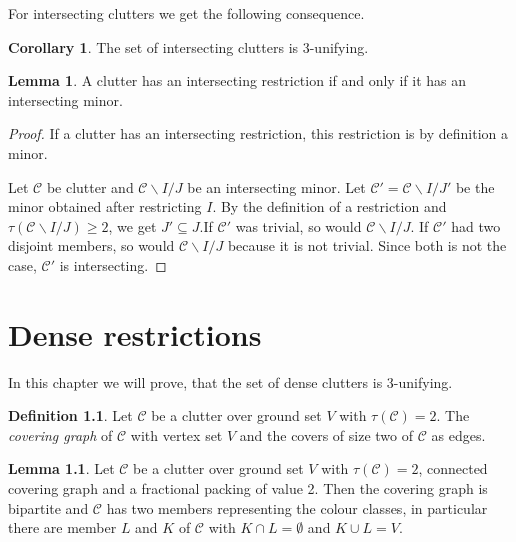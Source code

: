 \documentclass[a4paper, 12pt, twoside=false]{scrbook}
\theoremstyle{definition}
\newtheorem*{definition}{Definition}
\newtheorem{corollary}{Corollary}
\newtheorem{lemma}{Lemma}[chapter]
\begin{document}
   For intersecting clutters we get the following consequence.
   \begin{corollary}
       The set of intersecting clutters is 3-unifying.
   \end{corollary}

   \begin{lemma}
       A clutter has an intersecting restriction if and only if it has an intersecting minor.
   \end{lemma}

  \begin{proof}
      If a clutter has an intersecting restriction, this restriction is by definition a minor.

      Let $\mathcal{C}$ be clutter and $\mathcal{C} \backslash I /J$ be an intersecting minor.
      Let $\mathcal{C'}=\mathcal{C} \backslash I /J'$ be the minor obtained after restricting $I$.
      By the definition of a restriction and $\tau(\mathcal{C} \backslash I /J) \geq 2$, we get $J' \subseteq J$.If $\mathcal{C'}$ was trivial, so would $\mathcal{C} \backslash I / J$.
      If $\mathcal{C'}$ had two disjoint members, so would $\mathcal{C} \backslash I /J$ because it is not trivial.
      Since both is not the case, $\mathcal{C'}$ is intersecting.
  \end{proof}


   \chapter{Dense restrictions}
   In this chapter we will prove, that the set of dense clutters is 3-unifying.
   \begin{definition}
       Let $\mathcal{C}$ be a clutter over ground set $V$ with $\tau(\mathcal{C})=2$.
       The \emph{covering graph} of $\mathcal{C}$ with vertex set $V$ and the covers of size two of $\mathcal{C}$ as edges.
   \end{definition}

   \begin{lemma}
       Let $\mathcal{C}$ be a clutter over ground set $V$ with $\tau(\mathcal{C})=2$, connected covering graph and a fractional packing of value 2.
       Then the covering graph is bipartite and $\mathcal{C}$ has two members representing the colour classes, in particular there are member $L$ and $K$ of $\mathcal{C}$ with $K \cap L = \emptyset$ and $K \cup L = V$.
   \end{lemma}
\end{document}
